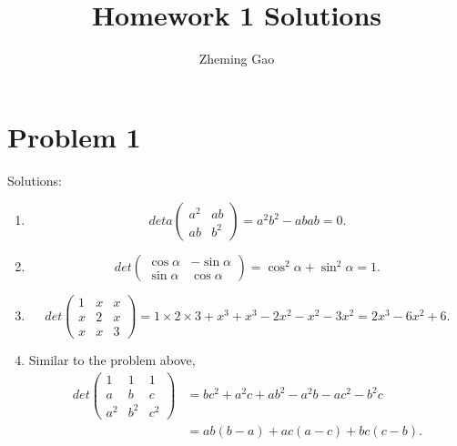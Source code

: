 \documentclass[12pt]{article}
\begin{document}
 
 
\title{Homework 1 Solutions}
\author{Zheming Gao}
\maketitle

\section{Problem 1}

Solutions: 
\begin{enumerate}
\item 
\begin{equation*}
deta
\begin{pmatrix}
a^2 & ab \\
ab & b^2
\end{pmatrix}
= a^2b^2 - abab = 0.
\end{equation*}

\item
\begin{equation*}
det
\begin{pmatrix}
\cos\alpha & -\sin\alpha \\
\sin\alpha & \cos\alpha
\end{pmatrix}
= \cos^2\alpha + \sin^2\alpha = 1.
\end{equation*}

\item
\begin{equation*}
det
\begin{pmatrix}
1 & x & x \\
x & 2 & x \\
x & x & 3
\end{pmatrix}
= 1\times 2 \times 3 + x^3 + x^3 - 2x^2 - x^2 - 3x^2 = 
2x^3 - 6x^2 + 6.
\end{equation*}

\item
Similar to the problem above, 
\begin{equation*}
\begin{aligned}
det
\begin{pmatrix}
1 & 1 & 1 \\
a & b & c \\
a^2 & b^2 & c^2
\end{pmatrix}
& = bc^2 + a^2c + ab^2 - a^2b - ac^2 - b^2c \\
& = ab(b-a) + ac(a-c) + bc(c-b).
\end{aligned}
\end{equation*}


\end{enumerate}
\end{document}
